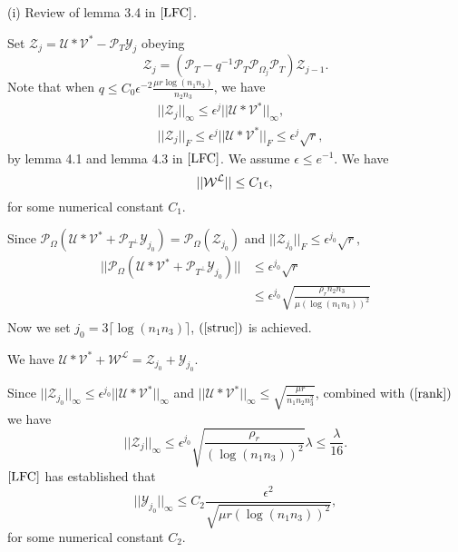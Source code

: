 \documentclass[journal,transmag]{IEEEtran}
\theoremstyle{plain}
\begin{document}
(i) Review of lemma 3.4 in $\cite{LFC}$.

\noindent Set $\mathcal{Z}_j = \mathcal{U} \ast \mathcal{V}^* - \mathcal{P}_T \mathcal{Y}_j$ obeying
\[\mathcal{Z}_j = (\mathcal{P}_T - q^{-1}\mathcal{P}_T \mathcal{P}_{\Omega_j}\mathcal{P}_T)\mathcal{Z}_{j-1}.\]
Note that when $q \le C_0 \epsilon^{-2} \frac{\mu r \log(n_1 n_3)}{n_2 n_3}$, we have
\begin{equation}
\begin{split}
&||\mathcal{Z}_j||_{\infty}\le \epsilon^j ||\mathcal{U} \ast \mathcal{V}^*||_{\infty},  \\
&||\mathcal{Z}_j||_F\le \epsilon^j ||\mathcal{U} \ast \mathcal{V}^*||_F \le \epsilon^j \sqrt{r},
\end{split}
\end{equation}
by lemma 4.1 and lemma 4.3 in $\cite{LFC}$. We assume $\epsilon \le e^{-1}$.
We have
\begin{equation}
{||\mathcal{W}^{\mathcal{L}}|| \le C_1 \epsilon, \\}
\end{equation}
for some numerical constant $C_1$.

\noindent Since $\mathcal{P}_{\Omega}(\mathcal{U}\ast\mathcal{V}^* +\mathcal{P}_{T^{\bot}}\mathcal{Y}_{j_0})=\mathcal{P}_{\Omega}(\mathcal{Z}_{j_0})$ and $||\mathcal{Z}_{j_0}||_F \le \epsilon^{j_0} \sqrt{r},$
\begin{equation}
\begin{split}
||\mathcal{P}_{\Omega}(\mathcal{U}\ast\mathcal{V}^* +\mathcal{P}_{T^{\bot}}\mathcal{Y}_{j_0})|| &\le \epsilon^{j_0} \sqrt{r} \\
& \le \epsilon^{j_0} \sqrt{\frac{\rho_r n_2 n_3}{\mu (\log(n_1 n_3))^2}}\\
\end{split}
\end{equation}
Now we set $j_0 =3 \lceil \log(n_1 n_3) \rceil $, $(\ref{struc})$ is achieved.

\noindent We have $\mathcal{U}\ast\mathcal{V}^* + \mathcal{W}^{\mathcal{L}} = \mathcal{Z}_{j_0}+\mathcal{Y}_{j_0}$.

\noindent Since $||\mathcal{Z}_{j_0}||_{\infty}\le \epsilon^{j_0} ||\mathcal{U} \ast \mathcal{V}^*||_{\infty}$ and $||\mathcal{U} \ast \mathcal{V}^*||_{\infty} \le \sqrt{\frac{\mu r}{n_1 n_2 n_3 ^2}}$, combined with $(\ref{rank})$ we have
\[||\mathcal{Z}_j||_{\infty}\le \epsilon^{j_0} \sqrt{\frac{\rho_r}{(\log(n_1 n_3))^2}}\lambda \le \frac{\lambda}{16}.\]
$\cite{LFC}$ has established that \[||\mathcal{Y}_{j_0}||_{\infty}\le C_2 \frac{\epsilon^2}{\sqrt{\mu r (\log(n_1 n_3))^2}},\] for some numerical constant $C_2$.
\end{document}
